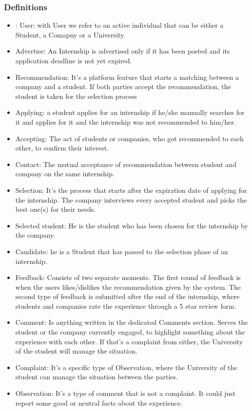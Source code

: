 \documentclass{article}
\begin{document}
\subsubsection{Definitions}
    \begin{itemize}
        \item: User: with User we refer to an active individual that can be either a Student, a Comapny or a University.
        \item Advertise: An Internship is advertised only if it has been posted and its application deadline is not yet expired.
        \item Recommendation: It's a platform feature that starts a matching between a company and a student. If both parties accept the recommendation, the student is taken for the selection process
        \item Applying: a student applies for an internship if he/she manually searches for it and applies for it and the internship was not recommended to him/her.
        \item Accepting: The act of students or companies, who got recommended to each other, to confirm their interest.
        \item Contact: The mutual acceptance of recommendation between student and company on the same internship.
        \item Selection: It's the process that starts after the expiration date of applying for the internship. The company interviews every accepted student and picks the best one(s) for their needs.
        \item Selected student: He is the student who has been chosen for the internship by the company.
        \item Candidate: he is a Student that has passed to the selection phase of an internship.
        \item Feedback: Consists of two separate moments.
        The first round of feedback is when the users likes/dislikes the recommendation given by the system. The second type of feedback is submitted after the end of the internship, where students and companies rate the experience through a 5 star review form.
        \item Comment: Is anything written in the dedicated Comments section. Serves the student or the company currently engaged, to highlight something about the experience with each other. If that's a complaint from either, the University of the student will manage the situation.
        \item Complaint: It's a specific type of Observation, where the University of the student can manage the situation between the parties.
        \item Observation: It's a type of comment that is not a complaint. It could just report some good or neutral facts about the experience.
    \end{itemize}
\end{document}
